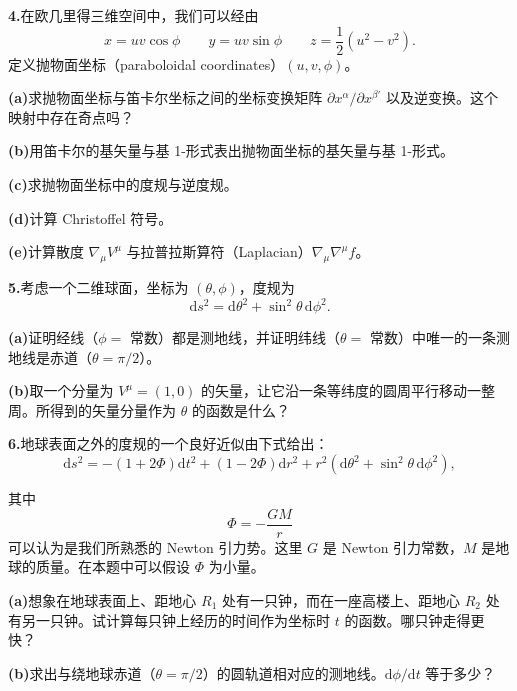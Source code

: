 \textbf{4.}\quad 在欧几里得三维空间中，我们可以经由
\begin{equation*}
x = uv\cos\phi\qquad y = uv\sin\phi\qquad z = \frac{1}{2}(u^{2}-v^{2}).
\end{equation*}
定义抛物面坐标（paraboloidal coordinates）$(u,v,\phi)$。

\textbf{(a)}\quad 求抛物面坐标与笛卡尔坐标之间的坐标变换矩阵 $\partial x^{\alpha}/\partial x^{\beta'}$ 以及逆变换。这个映射中存在奇点吗？

\textbf{(b)}\quad 用笛卡尔的基矢量与基 1-形式表出抛物面坐标的基矢量与基 1-形式。

\textbf{(c)}\quad 求抛物面坐标中的度规与逆度规。

\textbf{(d)}\quad 计算 Christoffel 符号。

\textbf{(e)}\quad 计算散度 $\nabla_{\mu}V^{\mu}$ 与拉普拉斯算符（Laplacian）$\nabla_{\mu}\nabla^{\mu}f$。

\textbf{5.}\quad 考虑一个二维球面，坐标为 $(\theta,\phi)$，度规为
\begin{equation*}
\mathrm{d}s^{2} = \mathrm{d}\theta^{2} + \sin^{2}\theta\,\mathrm{d}\phi^{2}.
\tag{3.217}
\end{equation*}

\textbf{(a)}\quad 证明经线（$\phi=$ 常数）都是测地线，并证明纬线（$\theta=$ 常数）中唯一的一条测地线是赤道（$\theta=\pi/2$）。

\textbf{(b)}\quad 取一个分量为 $V^{\mu}=(1,0)$ 的矢量，让它沿一条等纬度的圆周平行移动一整周。所得到的矢量分量作为 $\theta$ 的函数是什么？

\textbf{6.}\quad 地球表面之外的度规的一个良好近似由下式给出：
\begin{equation*}
\mathrm{d}s^{2} = -(1+2\Phi)\mathrm{d}t^{2} + (1-2\Phi)\mathrm{d}r^{2} + r^{2}(\mathrm{d}\theta^{2} + \sin^{2}\theta\,\mathrm{d}\phi^{2}),
\tag{3.218}
\end{equation*}

其中
\begin{equation*}
\Phi = -\frac{GM}{r}
\tag{3.219}
\end{equation*}
可以认为是我们所熟悉的 Newton 引力势。这里 $G$ 是 Newton 引力常数，$M$ 是地球的质量。在本题中可以假设 $\Phi$ 为小量。

\textbf{(a)}\quad 想象在地球表面上、距地心 $R_{1}$ 处有一只钟，而在一座高楼上、距地心 $R_{2}$ 处有另一只钟。试计算每只钟上经历的时间作为坐标时 $t$ 的函数。哪只钟走得更快？

\textbf{(b)}\quad 求出与绕地球赤道（$\theta=\pi/2$）的圆轨道相对应的测地线。$\mathrm{d}\phi/\mathrm{d}t$ 等于多少？

